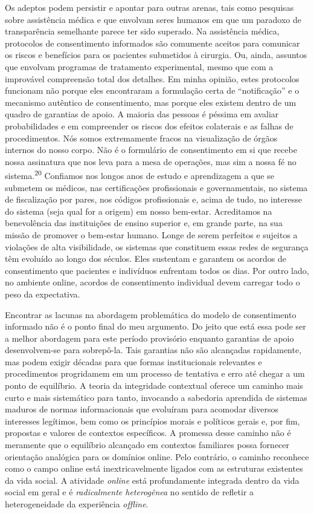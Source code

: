 Os adeptos podem persistir e apontar para outras arenas, tais como
pesquisas sobre assistência médica e que envolvam seres humanos em que
um paradoxo de transparência semelhante parece ter sido superado. Na
assistência médica, protocolos de consentimento informados são comumente
aceitos para comunicar os riscos e benefícios para os pacientes
submetidos à cirurgia. Ou, ainda, assuntos que envolvam programas de
tratamento experimental, mesmo que com a improvável compreensão total
dos detalhes. Em minha opinião, estes protocolos funcionam não porque
eles encontraram a formulação certa de ``notificação'' e o mecanismo
autêntico de consentimento, mas porque eles existem dentro de um quadro
de garantias de apoio. A maioria das pessoas é péssima em avaliar
probabilidades e em compreender os riscos dos efeitos colaterais e as
falhas de procedimentos. Nós somos extremamente fracos na visualização
de órgãos internos do nosso corpo. Não é o formulário de consentimento
em si que recebe nossa assinatura que nos leva para a mesa de operações,
mas sim a nossa fé no sistema.\textsuperscript{{20}} Confiamos nos
longos anos de estudo e aprendizagem a que se submetem os médicos, nas
certificações profissionais e governamentais, no sistema de fiscalização
por pares, nos códigos profissionais e, acima de tudo, no interesse do
sistema (seja qual for a origem) em nosso bem-estar. Acreditamos na
benevolência das instituições de ensino superior e, em grande parte, na
sua missão de promover o bem-estar humano. Longe de serem perfeitos e
sujeitos a violações de alta visibilidade, os sistemas que constituem
essas redes de segurança têm evoluído ao longo dos séculos. Eles
sustentam e garantem os acordos de consentimento que pacientes e
indivíduos enfrentam todos os dias. Por outro lado, no ambiente online,
acordos de consentimento individual devem carregar todo o peso da
expectativa.

Encontrar as lacunas na abordagem problemática do modelo de
consentimento informado não é o ponto final do meu argumento. Do jeito
que está essa pode ser a melhor abordagem para este período provisório
enquanto garantias de apoio desenvolvem-se para sobrepô-la. Tais
garantias não são alcançadas rapidamente, mas podem exigir décadas para
que formas institucionais relevantes e procedimentos progridamem em um
processo de tentativa e erro até chegar a um ponto de equilíbrio. A
teoria da integridade contextual oferece um caminho mais curto e mais
sistemático para tanto, invocando a sabedoria aprendida de sistemas
maduros de normas informacionais que evoluíram para acomodar diversos
interesses legítimos, bem como os princípios morais e políticos gerais
e, por fim, propostas e valores de contextos específicos. A promessa
desse caminho não é meramente que o equilíbrio alcançado em contextos
familiares possa fornecer orientação analógica para os domínios online.
Pelo contrário, o caminho reconhece como o campo online está
inextricavelmente ligados com as estruturas existentes da vida social. A
atividade \emph{online} está profundamente integrada dentro da vida
social em geral e é \emph{radicalmente heterogênea} no sentido de
refletir a heterogeneidade da experiência \emph{offline}.

